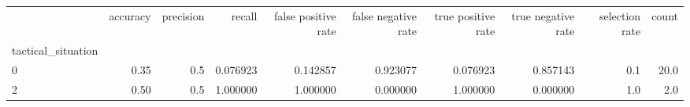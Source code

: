 \begin{tabular}{lrrrrrrrrr}
\toprule
{} &  accuracy &  precision &    recall &  false positive rate &  false negative rate &  true positive rate &  true negative rate &  selection rate &  count \\
tactical\_situation &           &            &           &                      &                      &                     &                     &                 &        \\
\midrule
0                  &      0.35 &        0.5 &  0.076923 &             0.142857 &             0.923077 &            0.076923 &            0.857143 &             0.1 &   20.0 \\
2                  &      0.50 &        0.5 &  1.000000 &             1.000000 &             0.000000 &            1.000000 &            0.000000 &             1.0 &    2.0 \\
\bottomrule
\end{tabular}

